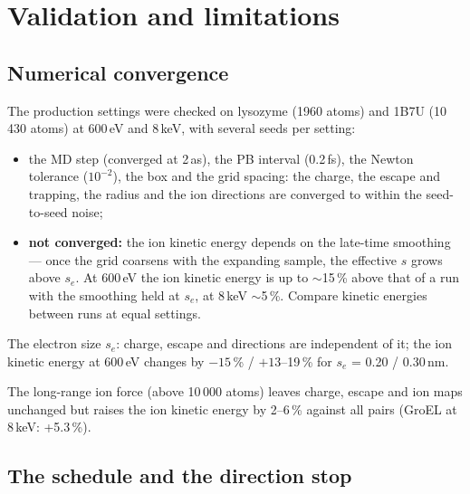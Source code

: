 \chapter{Validation and limitations}
\label{app:validation}

\section{Numerical convergence}

The production settings were checked on lysozyme (1960 atoms) and 1B7U (10\,430 atoms) at 600\,eV and 8\,keV, with
several seeds per setting:
\begin{itemize}
  \item the MD step (converged at 2\,as), the PB interval (0.2\,fs), the Newton tolerance ($10^{-2}$), the box and the grid
    spacing: the charge, the escape and trapping, the radius and the ion directions are converged to within the
    seed-to-seed noise;
  \item \textbf{not converged:} the ion kinetic energy depends on the late-time smoothing --- once the grid coarsens with the
    expanding sample, the effective $s$ grows above $s_e$.
    At 600\,eV the ion kinetic energy is up to $\sim$15\,\% above that of a run with the smoothing held at $s_e$, at
    8\,keV $\sim$5\,\%.
    Compare kinetic energies between runs at equal settings.
\end{itemize}
The electron size $s_e$: charge, escape and directions are independent of it; the ion kinetic energy at 600\,eV changes
by $-15$\,\% / $+13$--19\,\% for $s_e$ = 0.20 / 0.30\,nm.

The long-range ion force (above 10\,000 atoms) leaves charge, escape and ion maps unchanged but raises the ion kinetic
energy by 2--6\,\% against all pairs (GroEL at 8\,keV: +5.3\,\%).

\section{The schedule and the direction stop}
\label{sec:val-schedule}

